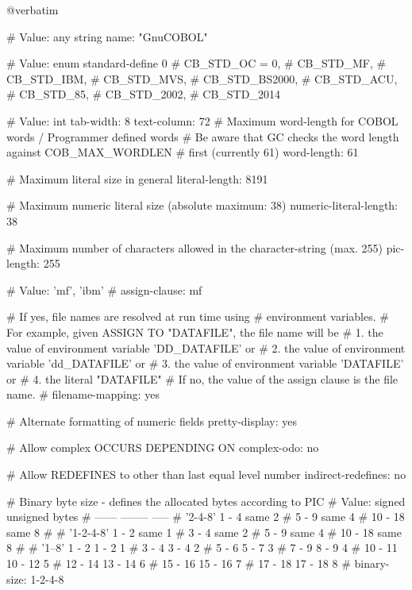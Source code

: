 @verbatim


# Value: any string
name: "GnuCOBOL"

# Value: enum
standard-define			0
#        CB_STD_OC = 0,
#        CB_STD_MF,
#        CB_STD_IBM,
#        CB_STD_MVS,
#        CB_STD_BS2000,
#        CB_STD_ACU,
#        CB_STD_85,
#        CB_STD_2002,
#        CB_STD_2014

# Value: int
tab-width:			8
text-column:			72
# Maximum word-length for COBOL words / Programmer defined words
# Be aware that GC checks the word length against COB_MAX_WORDLEN
# first (currently 61)
word-length:			61

# Maximum literal size in general
literal-length:			8191

# Maximum numeric literal size (absolute maximum: 38)
numeric-literal-length:		38

# Maximum number of characters allowed in the character-string (max. 255)
pic-length:			255

# Value: 'mf', 'ibm'
#
assign-clause:			mf

# If yes, file names are resolved at run time using
# environment variables.
# For example, given ASSIGN TO "DATAFILE", the file name will be
#  1. the value of environment variable 'DD_DATAFILE' or
#  2. the value of environment variable 'dd_DATAFILE' or
#  3. the value of environment variable 'DATAFILE' or
#  4. the literal "DATAFILE"
# If no, the value of the assign clause is the file name.
#
filename-mapping:		yes

# Alternate formatting of numeric fields
pretty-display:			yes

# Allow complex OCCURS DEPENDING ON
complex-odo:			no

# Allow REDEFINES to other than last equal level number
indirect-redefines:		no

# Binary byte size - defines the allocated bytes according to PIC
# Value:         signed  unsigned  bytes
#                ------  --------  -----
# '2-4-8'        1 -  4    same        2
#                5 -  9    same        4
#               10 - 18    same        8
#
# '1-2-4-8'      1 -  2    same        1
#                3 -  4    same        2
#                5 -  9    same        4
#               10 - 18    same        8
#
# '1--8'         1 -  2    1 -  2      1
#                3 -  4    3 -  4      2
#                5 -  6    5 -  7      3
#                7 -  9    8 -  9      4
#               10 - 11   10 - 12      5
#               12 - 14   13 - 14      6
#               15 - 16   15 - 16      7
#               17 - 18   17 - 18      8
#
binary-size:			1-2-4-8

